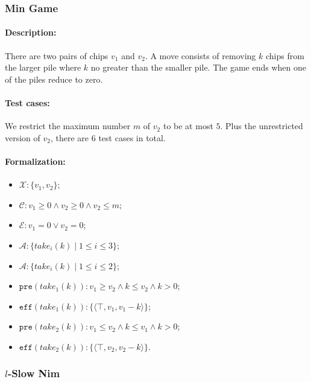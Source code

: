 \documentclass[review]{elsarticle}
\newcommand{\set}[1]{\{ #1 \}}
\newcommand{\tuple}[1]{\langle {#1} \rangle}
\newcommand{\true}{\top}
\newcommand{\statevar}{\mathcal{X}}
\newcommand{\act}{\mathcal{A}}
\newcommand{\constraint}{\mathcal{C}}
\newcommand{\estate}{\mathcal{E}}
\newcommand{\pre}{\mathtt{pre}}
\newcommand{\eff}{\mathtt{eff}}
\begin{document}
\subsubsection{Min Game \protect\cite{CaiH2010}}
\paragraph{Description:} 
There are two pairs of chips $v_1$ and $v_2$. 
A move consists of removing $k$ chips from the larger pile where $k$ no greater than the smaller pile. 
The game ends when one of the piles reduce to zero.

\paragraph{Test cases:} 
We restrict the maximum number $m$ of $v_2$ to be at most $5$. 
Plus the unrestricted version of $v_2$, there are $6$ test cases in total.
\paragraph{Formalization:}

\begin{itemize}
	\item $\statevar: \set{v_1, v_2}$;
	\item $\constraint: v_1 \ge 0 \wedge v_2 \ge 0\wedge v_2 \le m$;
	\item $\estate: v_1=0 \vee v_2 =0$;
	\item $\act:\set{take_i(k){\mid}1\le i \le3 }$;
	\item {\color{red}$\act:\set{take_i(k){\mid}1\le i \le 2}$;}
	\item $\pre(take_1(k)) : v_1 \ge v_2 \wedge k \le v_2 \wedge k > 0$;
	\item $\eff(take_1(k)) : \set{\tuple{\true, v_1, v_1-k}}$;
	\item $\pre(take_2(k)) : v_1 \le v_2 \wedge k \le v_1 \wedge k > 0$;
	\item $\eff(take_2(k)) : \set{\tuple{\true, v_2, v_2-k}}$.
	
\end{itemize}



\subsubsection{$l$-Slow Nim \protect\cite{AhnCCEFGGKMPS2017}}
\end{document}
